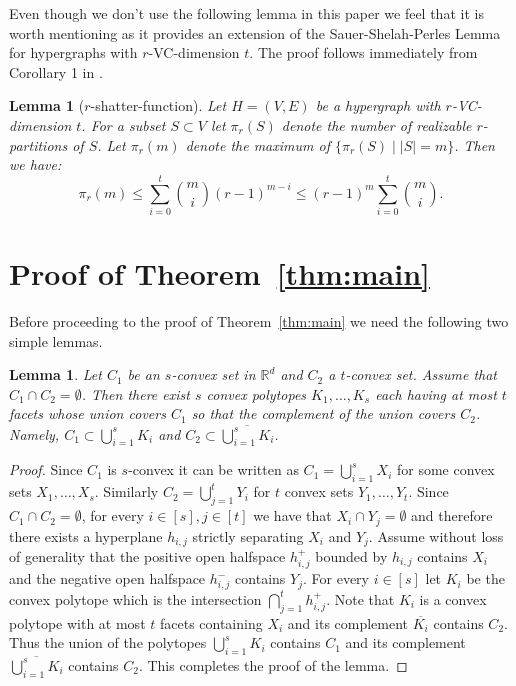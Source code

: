 \documentclass[11pt]{article}
\def\Re{\mathbb R}
\theoremstyle{plain}
\newtheorem{lemma}[theorem]{Lemma}
\theoremstyle{definition}
\theoremstyle{remark}
\begin{document}
Even though we don't use the following lemma in this paper we feel that it is worth mentioning as it provides an extension of the Sauer-Shelah-Perles Lemma for hypergraphs with $r$-VC-dimension $t$. 
The proof follows immediately from Corollary 1 in \cite{Alon1983}.

\begin{lemma}[$r$-shatter-function]
\label{lem:generalized-Sauer-Shelah}
Let $H=(V,E)$ be a hypergraph with $r$-VC-dimension $t$.
For a subset $S \subset V$ let $\pi_r(S)$ denote the number of realizable $r$-partitions of $S$.
Let $\pi_r(m)$ denote the maximum of $\{\pi_r(S) \mid |S|=m\}$.
Then we have:
$$\pi_r(m)\leq  \sum_{i=0}^t {m \choose i}(r-1)^{m-i} 
	\leq (r-1)^m\sum_{i=0}^t {m \choose i }.$$
\end{lemma}

\section{Proof of Theorem~\ref{thm:main}}
\label{sec:proof-thm-main}
Before proceeding to the proof of Theorem~\ref{thm:main} we need the
following two simple lemmas.
 \begin{lemma}\label{lem:separation}
     Let $C_1$ be an $s$-convex set in $\Re^d$ and $C_2$ a $t$-convex
     set. Assume that $C_1 \cap C_2 = \emptyset$. Then there exist
     $s$ convex polytopes $K_1,\ldots, K_s$ each having at most
$t$ facets whose union covers $C_1$ so that the complement of
     the union covers $C_2$. Namely,  $C_1 \subset \bigcup_{i=1}^s K_i$
     and $C_2 \subset \overline{\bigcup_{i=1}^s K_i}$.
 \end{lemma}

 \begin{proof}
     Since $C_1$ is $s$-convex it can be written as $C_1 = \bigcup_{i=1}^s
     X_i$  for some convex sets $X_1,\ldots,X_s$.  Similarly  $C_2
     = \bigcup_{j=1}^t Y_i$ for $t$ convex sets $Y_1,\ldots,Y_t$.
     Since $C_1 \cap C_2= \emptyset$, for every $i \in [s], j \in [t]$
     we have that $X_i \cap Y_j = \emptyset$ and therefore there exists
     a hyperplane $h_{i,j}$ strictly separating $X_i$ and $Y_j$. Assume
     without loss of generality that the positive open halfspace
     $h_{i,j}^+$ bounded by $h_{i,j}$ contains $X_i$ and the negative open
     halfspace $h_{i,j}^-$ contains $Y_j$. For every $i \in [s]$ let $K_i$
     be the convex polytope which is the intersection $\bigcap_{j=1}^t
     h_{i,j}^+$. Note that $K_i$ is a convex polytope with at most $t$
     facets containing $X_i$ and its complement $\overline{K_i}$ contains
     $C_2$. Thus the union of the polytopes $\bigcup_{i=1}^s K_i$ contains
     $C_1$ and its complement $\overline{\bigcup_{i=1}^s K_i}$ contains
     $C_2$. 
	 This completes the proof of the lemma.
 \end{proof}
\end{document}
